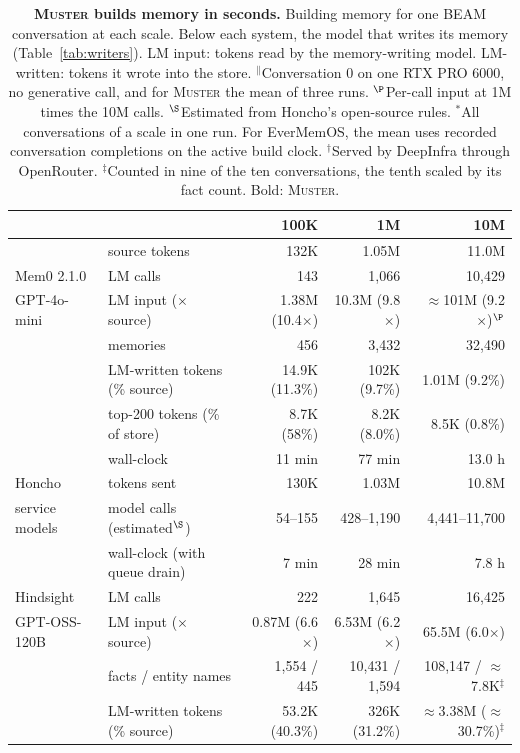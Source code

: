 \documentclass{article}
\newcommand{\tabfont}{\fontsize{7.5}{8.5}\selectfont\renewcommand{\arraystretch}{1.0}}
\newcommand{\sys}{\textsc{Muster}}
\begin{document}
\begin{table}[!htbp]
\centering\tabfont
\caption{\textbf{\sys{} builds memory in seconds.} Building memory for one BEAM \cite{beam} conversation at each scale. Below each system, the model that writes its memory (Table~\ref{tab:writers}). LM input: tokens read by the memory-writing model. LM-written: tokens it wrote into the store. $^\|$Conversation 0 on one RTX PRO 6000, no generative call, and for \sys{} the mean of three runs. $^\P$Per-call input at 1M times the 10M calls. $^\S$Estimated from Honcho's open-source rules. $^\ast$All conversations of a scale in one run. For EverMemOS, the mean uses recorded conversation completions on the active build clock. $^\dagger$Served by DeepInfra through OpenRouter. $^\ddagger$Counted in nine of the ten conversations, the tenth scaled by its fact count. Bold: \sys{}.}
\label{tab:beamcost}
\setlength{\tabcolsep}{5pt}
\begin{tabular}{llrrr}
\toprule
& & 100K & 1M & 10M \\
\midrule
& source tokens & 132K & 1.05M & 11.0M \\
\midrule
Mem0 2.1.0 & LM calls & 143 & 1{,}066 & 10{,}429 \\
\quad GPT-4o-mini & LM input ($\times$ source) & 1.38M (10.4$\times$) & 10.3M (9.8$\times$) & $\approx$101M (9.2$\times$)$^\P$ \\
& memories & 456 & 3{,}432 & 32{,}490 \\
& LM-written tokens (\% source) & 14.9K (11.3\%) & 102K (9.7\%) & 1.01M (9.2\%) \\
& top-200 tokens (\% of store) & 8.7K (58\%) & 8.2K (8.0\%) & 8.5K (0.8\%) \\
& wall-clock & 11 min & 77 min & 13.0 h \\
\midrule
Honcho & tokens sent & 130K & 1.03M & 10.8M \\
\quad service models & model calls (estimated$^\S$) & 54--155 & 428--1{,}190 & 4{,}441--11{,}700 \\
& wall-clock (with queue drain) & 7 min & 28 min & 7.8 h \\
\midrule
Hindsight & LM calls & 222 & 1{,}645 & 16{,}425 \\
\quad GPT-OSS-120B & LM input ($\times$ source) & 0.87M (6.6$\times$) & 6.53M (6.2$\times$) & 65.5M (6.0$\times$) \\
& facts / entity names & 1{,}554 / 445 & 10{,}431 / 1{,}594 & 108{,}147 / $\approx$7.8K$^\ddagger$ \\
& LM-written tokens (\% source) & 53.2K (40.3\%) & 326K (31.2\%) & $\approx$3.38M ($\approx$30.7\%)$^\ddagger$ \\

\end{tabular}
\end{table}
\end{document}
